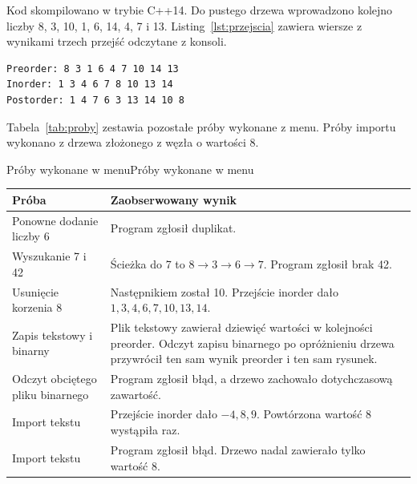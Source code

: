 Kod skompilowano w trybie C++14. Do pustego drzewa wprowadzono
kolejno liczby 8, 3, 10, 1, 6, 14, 4, 7 i 13. Listing~\ref{lst:przejscia}
zawiera wiersze z wynikami trzech przejść odczytane z konsoli.

\begin{lstlisting}[style=terminal,caption={Wyniki trzech przejść drzewa},label={lst:przejscia}]
Preorder: 8 3 1 6 4 7 10 14 13
Inorder: 1 3 4 6 7 8 10 13 14
Postorder: 1 4 7 6 3 13 14 10 8
\end{lstlisting}

Tabela~\ref{tab:proby} zestawia pozostałe próby wykonane z menu.
Próby importu wykonano z drzewa złożonego z węzła o wartości 8.

\begin{tabela}{Próby wykonane w menu}{Próby wykonane w menu}
              {\label{tab:proby}}
\small
\begin{tabularx}{\linewidth}{|L{4.8cm}|Y|}
\hline
\textbf{Próba} & \textbf{Zaobserwowany wynik}\\ \hline
Ponowne dodanie liczby 6 & Program zgłosił duplikat.\\ \hline
Wyszukanie 7 i 42 & Ścieżka do 7 to $8\to3\to6\to7$.
Program zgłosił brak 42.\\ \hline
Usunięcie korzenia 8 & Następnikiem został 10. Przejście inorder dało
$1,3,4,6,7,10,13,14$.\\ \hline
Zapis tekstowy i binarny & Plik tekstowy zawierał dziewięć wartości
w kolejności preorder. Odczyt zapisu binarnego po opróżnieniu drzewa
przywrócił ten sam wynik preorder i ten sam rysunek.\\ \hline
Odczyt obciętego pliku binarnego & Program zgłosił błąd,
a drzewo zachowało dotychczasową zawartość.\\ \hline
Import tekstu  &
Przejście inorder dało $-4,8,9$. Powtórzona wartość 8 wystąpiła raz.\\ \hline
Import tekstu  &
Program zgłosił błąd. Drzewo nadal zawierało tylko wartość 8.\\ \hline
\end{tabularx}
\end{tabela}
